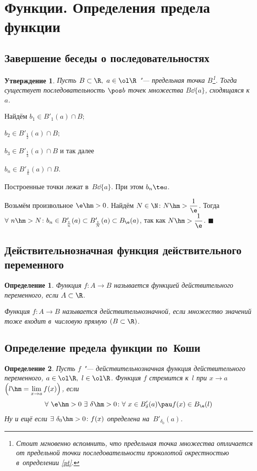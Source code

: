 \documentclass[a4paper,10pt,twoside]{article}
\newtheorem{Def}{Определение}[section]
\newtheorem{Ut}{Утверждение}[section]
\newenvironment{Proof}
       {\par\noindent{\textbf{Доказательство.}}}
       {\hfill$\scriptstyle\blacksquare$}
\let\AVsection\section{}
\renewcommand\section{\newpage\scol\AVsection}
\newcommand{\scol}{  \renewcommand{\headrulewidth}{0.5pt}\fancyhead[RE,LO]{\thesection{} \leftmark} \fancyhead[LE,RO]{\thepage}}
\begin{document}
\section{Функции. Определения предела функции}
\subsection{Завершение беседы о последовательностях}
\begin{Ut}
Пусть $B\subset\R,\ a\in\ol\R$ "--- предельная точка $B$\footnote{
Стоит мгновенно вспомнить, что предельная точка множества отличается от предельной точки последовательности проколотой окрестностью в~определении \ref{pt}.}. 
Тогда существует последовательность $\pos b$ точек множества $B\dd\{a\}$, сходящаяся к~$a$.
\end{Ut}

\begin{Proof}
Найдём $b_1\in B'_1(a)\cap B$;

$b_2\in B'_{\frac12}(a)\cap B$;

$b_3\in B'_{\frac13}(a)\cap B$ и так далее\ldotst{}

$b_n\in B'_{\frac1n}(a)\cap B$.

Построенные точки лежат в~$B\dd\{a\}$. При этом $b_n\te a$.

Возьмём произвольное $\e\hm>0$. Найдём $N\in\N\colon
N\hm>\dfrac1\e$. Тогда $\forall\  n\hm>N\colon
b_n\in B'_{\frac1n}(a)\subset B'_{\frac1N}(a)\subset B_\e(a)$, так как $N\hm>\dfrac1\e$.
\end{Proof}
\subsection{Действительнозначная функция действительного переменного}
\begin{Def}
Функция $f\colon A\to B$ называется функцией действительного переменного, если $A\subset \R$.

Функция $f\colon A\to B$ называется действительнозначной, если множество значений тоже входит в~числовую прямую $(B\subset \R)$.
\end{Def}

\subsection{Определение предела функции по~Коши}
\begin{Def}
Пусть $f$ "--- действительнозначная функция действительного переменного, $a\in\ol\R,\ l\in\ol\R$. 
Функция $f$ стремится к~$l$ при $x\to a$ $\left(l\hm=\lim\limits_{x\to a}f(x)\right)$, если
$$    \forall\ \e\hm>0\ \exists\  \delta\hm>0\colon \forall\  x\in B'_\delta(a)\pau f(x)\in B_\e(l)$$
Ну и ещё если $\exists\  \delta_0\hm>0\colon f(x)$ определена на~$B'_{\delta_0}(a)$.
\end{Def}
\end{document}
